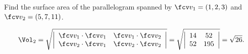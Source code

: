 \begin{frame}
\begin{example}
Find the surface area of the parallelogram spanned by $\fcv v_1 = (1,2,3)$ and $\fcv v_2=(5,7,11)$.

\[
\Vol_2=\sqrt{\left| \begin{array}{cc}\fcv v_1\cdot \fcv v_1 & \fcv v_1\cdot \fcv v_2 \\ \fcv  v_2\cdot \fcv v_1&\fcv v_2 \cdot \fcv v_2 \end{array} \right|} =\sqrt{\left|\begin{array}{cc} 14& 52\\
52& 195 \end{array}\right|} =\sqrt{26} .
\]
\end{example}
\end{frame}